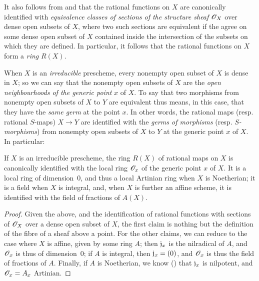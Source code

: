 \begin{env}[7.1.3]
\label{1.7.1.3}
It also follows from  and  that the rational functions on $X$ are canonically identified with \emph{equivalence classes of sections of the structure sheaf $\mathscr{O}_X$} over dense open subsets of $X$, where two such sections are equivalent if the agree on some dense open subset of $X$ contained inside the intersection of the subsets on which they are defined.
In particular, it follows that the rational functions on $X$ form a \emph{ring} $R(X)$.
\end{env}

\begin{env}[7.1.4]
\label{1.7.1.4}
When $X$ is an \emph{irreducible} prescheme, every nonempty open subset of $X$ is dense in $X$; so we can say that the nonempty open subsets of $X$ are the \emph{open neighbourhoods of the generic point} $x$ of $X$.
To say that two morphisms from nonempty open subsets of $X$ to $Y$ are equivalent thus means, in this case, that they have the \emph{same germ} at the point $x$.
In other words, the rational maps (resp. rational $S$-maps) $X\to Y$ are identified with the \emph{germs of morphisms} (resp. \emph{$S$-morphisms}) from nonempty open subsets of $X$ to $Y$ at the generic point $x$ of $X$.
In particular:
\end{env}

\begin{prop}[7.1.5]
\label{1.7.1.5}
If $X$ is an irreducible prescheme, the ring $R(X)$ of rational maps on $X$ is canonically identified with the local ring $\mathscr{O}_x$ of the generic point $x$ of $X$.
It is a local ring of dimension~0, and thus a local Artinian ring when $X$ is Noetherian; it is a field when $X$ is integral, and, when $X$ is further an affine scheme, it is identified with the field of fractions of $A(X)$.
\end{prop}

\begin{proof}
\label{proof-1.7.1.5}
Given the above, and the identification of rational functions with sections of $\mathscr{O}_X$ over a dense open subset of $X$, the first claim is nothing but the definition of the fibre of a sheaf above a point.
For the other claims, we can reduce to the case where $X$ is affine, given by some ring $A$; then $\mathfrak{j}_x$ is the nilradical of $A$, and $\mathscr{O}_x$ is thus of dimension~0; if $A$ is integral, then $\mathfrak{j}_x=(0)$, and $\mathscr{O}_x$ is thus the field of fractions of $A$.
Finally, if $A$ is Noetherian, we know (\cite[p.~127, cor.~4]{I-11}) that $\mathfrak{j}_x$ is nilpotent, and $\mathscr{O}_x=A_x$ Artinian.
\end{proof}

